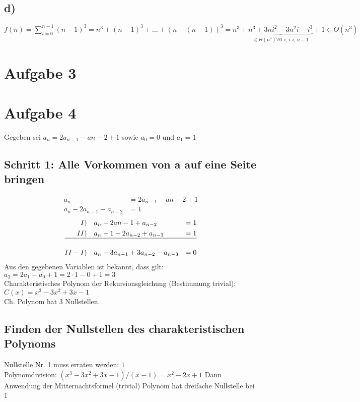 \documentclass[a4paper,10pt,freqn]{article}
\begin{document}
\subsection*{d)}
$f(n) = \sum_{i=0}^{n-1} (n-1)^3 = n^3 + (n-1)^3 + \dots +(n-(n-1))^3 = n^3 + \underbrace{n^3 + 3ni^2 - 3n^2i - i^3}_{\in \Theta(n^3)\forall
0<i<n-1} + 1 \in \Theta(n^3)$

\section{Aufgabe 3}

\section{Aufgabe 4}
Gegeben sei $a_n = 2a_{n-1}-a{n-2} + 1$
sowie $a_0 = 0$ und $a_1 = 1$\\
\subsection{Schritt 1: Alle Vorkommen von a auf eine Seite bringen}
\begin{align*}
a_n &= 2a_{n-1}-a{n-2}+1 \\
a_n-2a_{n-1}+a_{n-2}&=1
\end{align*}
\begin{align*}
I)\quad&a_n-2a{n-1}+a_{n-2}&=1\\
II)\quad&a_n-1-2a_{n-2}+a_{n-3}&=1\\
\hline\\
II-I)\quad&a_n-3a_{n-1}+3a_{n-2}-a_{n-3}&=0\label{(1)-(2)}
\end{align*}
Aus den gegebenen Variablen ist bekannt, dass gilt:\\$a_2 = 2a_1-a_0+1 = 2\cdot1-0+1=3$\\

Charakteristisches Polynom der Rekursionsgleichung (Bestimmung trivial):\\
$C(x) = x^3-3x^2+3x-1$\\
\textrightarrow Ch. Polynom hat 3 Nullstellen.
\subsection{Finden der Nullstellen des charakteristischen Polynoms}
Nullstelle Nr. 1 muss erraten werden: $1$\\
Polynomdivision: $(x^3-3x^2+3x-1)/(x-1)=x^2-2x+1$
Dann Anwendung der Mitternachtsformel (trivial) \textrightarrow Polynom hat dreifache Nullstelle bei 1
\end{document}
